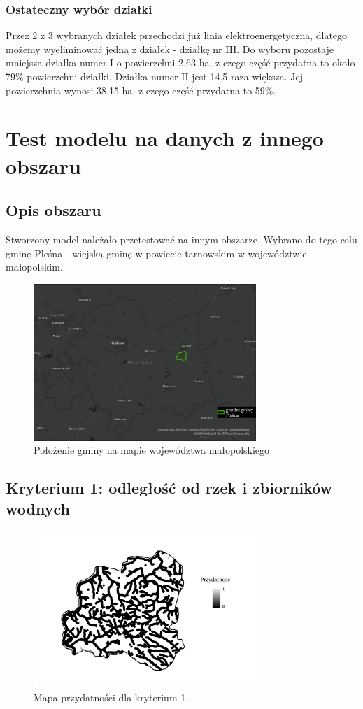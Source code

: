 \documentclass{article}
\begin{document}
\subsubsection{Ostateczny wybór działki}
Przez 2 z 3 wybranych działek przechodzi już linia elektroenergetyczna, dlatego możemy wyeliminować jedną z działek - działkę nr III. Do wyboru pozostaje mniejsza działka numer I o powierzchni 2.63 ha, z czego część przydatna to około 79\% powierzchni działki. Działka numer II jest 14.5 raza większa. Jej powierzchnia wynosi 38.15 ha, z czego część przydatna to 59\%.

\section{Test modelu na danych z innego obszaru}
\subsection{Opis obszaru}
Stworzony model należało przetestować na innym obszarze. Wybrano do tego celu gminę Pleśna - wiejską gminę w powiecie tarnowskim w województwie małopolskim.

\begin{figure}[H]
    \centering
    \includegraphics[width=0.75\textwidth]{img/plesna-polozenie.jpg}
    \caption*{Położenie gminy na mapie województwa małopolskiego}
\end{figure}

\subsection{Kryterium 1: odległość od rzek i zbiorników wodnych}
\begin{figure}[H]
    \centering
    \includegraphics[width=0.75\textwidth]{img/plesna-kryterium1-layout.jpg}
    \caption*{Mapa przydatności dla kryterium 1.}
\end{figure}
\end{document}
